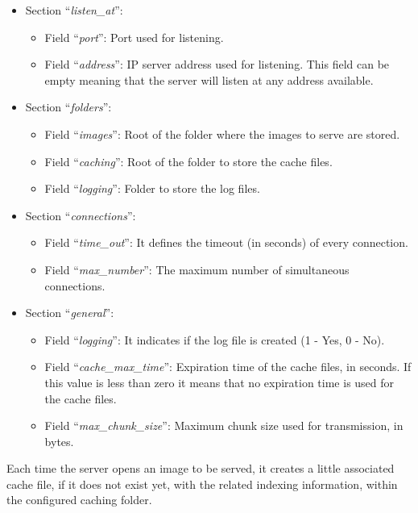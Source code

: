 \begin{itemize}
	\item Section ``\textit{listen\_at}'':
		\begin{itemize}
			\item Field ``\textit{port}'': Port used for listening.
			\item Field ``\textit{address}'': IP server address used for listening. This
field can be empty meaning that the server will listen at any address available.
		\end{itemize}

	\item Section ``\textit{folders}'':
		\begin{itemize}
			\item Field ``\textit{images}'': Root of the folder where the images to serve
are stored.
			\item	Field ``\textit{caching}'': Root of the folder to store the cache files.
			\item	Field ``\textit{logging}'': Folder to store the log files.
		\end{itemize}
	\item Section ``\textit{connections}'':
		\begin{itemize}
			\item Field ``\textit{time\_out}'': It defines the timeout (in seconds) of every connection.
			\item	Field ``\textit{max\_number}'': The maximum number of simultaneous connections.
		\end{itemize}
	\item Section ``\textit{general}'':
		\begin{itemize}
			\item Field ``\textit{logging}'': It indicates if the log file is created (1 - Yes, 0 - No).
			\item	Field ``\textit{cache\_max\_time}'': Expiration time of the cache files, in seconds. If
this value is less than zero it means that no expiration time is used for the cache files.
			\item	Field ``\textit{max\_chunk\_size}'': Maximum chunk size used for transmission, in bytes.
		\end{itemize}
\end{itemize}

Each time the server opens an image to be served, it creates a little associated cache file,
if it does not exist yet, with the related indexing information, within the configured
caching folder.

